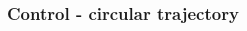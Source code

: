 \begin{frame}
\frametitle{Control - circular trajectory}
\begin{columns}
	\begin{column}{0.5\textwidth}
	\begin{figure}
	\end{figure}
	\end{column}
	\begin{column}{0.5\textwidth}
	\begin{figure}
	\end{figure}
	\end{column}
\end{columns}
\end{frame}
